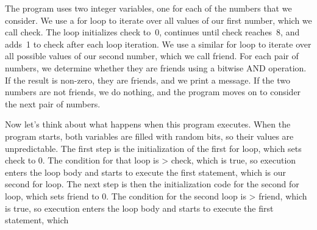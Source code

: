 The program uses two
integer variables, one for each of the numbers that we consider.
We use a {\tfix for} loop to iterate over all values of our first
number, which we call {\tfix check}.  The loop initializes {\tfix check}
to~0, continues until check reaches~8, and adds~1 to check after
each loop iteration.  We use a similar {\tfix for} loop to iterate
over all possible values of our second number, which we call {\tfix friend}.
For each pair of numbers, we determine whether they are friends
using a bitwise AND operation.  If the result is non-zero, they
are friends, and we print a message.  If the two numbers are not
friends, we do nothing, and the program moves on to consider the
next pair of numbers.

\begin{minipage}{1.65in}
Now let's think about what happens when this program executes.
%
When the program starts, both variables are filled with random bits,
so their values are unpredictable.  
%
The first step is the initialization of the first {\tfix for} loop, which
sets {\tfix check} to 0.
%
The condition for that loop is { > check}, which is true, so
execution enters the loop body and starts to execute the first
statement, which is our second {\tfix for} loop.
%
The next step is then the initialization code for the second {\tfix for}
loop, which sets {\tfix friend} to 0.
%
The condition for the second loop is { > friend}, which is true, so
execution enters the loop body and starts to execute the first
statement, which\linebreak\mpdone
\end{minipage}\hspace{0.25in}%
